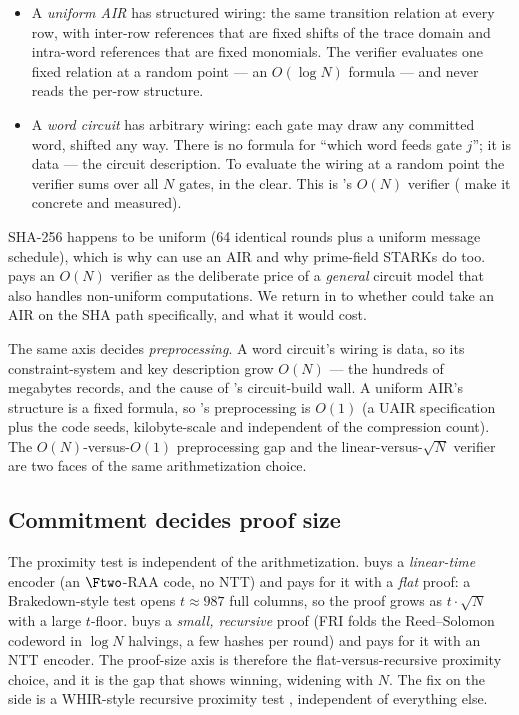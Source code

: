 \begin{itemize}
  \item A \emph{uniform AIR} has structured wiring: the same transition
  relation at every row, with inter-row references that are fixed shifts
  of the trace domain and intra-word references that are fixed monomials.
  The verifier evaluates one fixed relation at a random point --- an
  $O(\log N)$ formula --- and never reads the per-row structure.

  \item A \emph{word circuit} has arbitrary wiring: each gate may draw any
  committed word, shifted any way. There is no formula for ``which word
  feeds gate $j$''; it is data --- the circuit description. To evaluate
  the wiring at a random point the verifier sums over all $N$ gates, in
  the clear. This is \binius{}'s $O(N)$ verifier
  ( make it concrete and measured).
\end{itemize}

SHA-256 happens to be uniform (64 identical rounds plus a uniform message
schedule), which is why \zinc{} can use an AIR and why prime-field STARKs
do too. \binius{} pays an $O(N)$ verifier as the deliberate price of a
\emph{general} circuit model that also handles non-uniform computations.
We return in  to whether \binius{} could take an AIR on
the SHA path specifically, and what it would cost.

The same axis decides \emph{preprocessing}. A word circuit's wiring is
data, so its constraint-system and key description grow $O(N)$ --- the
hundreds of megabytes  records, and the cause of
\binius{}'s circuit-build wall. A uniform AIR's structure is a fixed
formula, so \zinc{}'s preprocessing is $O(1)$ (a UAIR specification plus
the code seeds, kilobyte-scale and independent of the compression count).
The $O(N)$-versus-$O(1)$ preprocessing gap and the linear-versus-$\sqrt N$
verifier are two faces of the same arithmetization choice.

\subsection{Commitment decides proof size}
\label{sec:axis-commit}

The proximity test is independent of the arithmetization. \zinc{} buys a
\emph{linear-time} encoder (an $\Ftwo$-RAA code, no NTT) and pays for it
with a \emph{flat} proof: a Brakedown-style test opens $t \approx 987$
full columns, so the proof grows as $t\cdot\sqrt{N}$ with a large
$t$-floor. \binius{} buys a \emph{small, recursive} proof (FRI folds the
Reed--Solomon codeword in $\log N$ halvings, a few hashes per round) and
pays for it with an NTT encoder. The proof-size axis is therefore the
flat-versus-recursive proximity choice, and it is the gap that
 shows \binius{} winning, widening with $N$. The fix on
the \zinc{} side is a WHIR-style recursive proximity test
\cite{whir}, independent of everything else.

